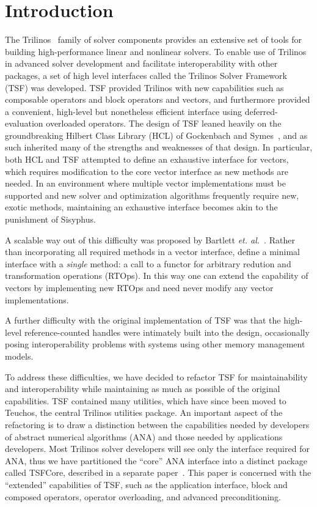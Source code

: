 \section{Introduction}

The Trilinos~\cite{ref:trilinos} 
family of solver components provides an extensive set of
tools for building high-performance linear and nonlinear solvers. To 
enable use of Trilinos in advanced solver development
and facilitate interoperability
with other packages, a set of high level interfaces called the Trilinos
Solver Framework~\cite{ref:TSF} (TSF) was developed. 
TSF provided
Trilinos with 
new capabilities such as composable operators and block operators and vectors, 
and furthermore provided a convenient, high-level but nonetheless efficient
interface using deferred-evaluation overloaded operators.  The design of 
TSF leaned heavily on the groundbreaking
Hilbert Class Library (HCL) of Gockenbach and Symes~\cite{ref:hcl}, and as 
such inherited many of the strengths and weaknesses of that design. 
In particular, both HCL and TSF attempted to define an exhaustive interface
for vectors, which requires modification to the core vector interface
as new methods are needed. In an environment where multiple 
vector implementations must be supported and new solver and
optimization algorithms frequently require new, exotic methods,
maintaining an exhaustive
interface becomes akin to the punishment of Sisyphus.

A scalable way out of this difficulty was 
proposed by Bartlett {\it et. al.}~\cite{ref:rtop_toms}.
Rather than incorporating all
required methods in a vector interface, define a minimal interface
with a {\it single} method: a call to a functor for arbitrary redution
and transformation operations (RTOps). In this way one can
extend the capability of vectors by implementing new RTOps and need never
modify any vector implementations.  

A further difficulty with the original implementation of TSF was that the
high-level reference-counted 
handles were intimately built into the design, occasionally
posing interoperability problems with systems using other memory management
models. 

To address these difficulties, we have decided to refactor TSF for 
maintainability and interoperability while maintaining as much as possible
of the original capabilities. TSF contained many utilities, which
have since been moved to Teuchos, the central Trilinos utilities
package. An important aspect of the refactoring is to draw
a distinction between the capabilities needed by developers of abstract
numerical algorithms (ANA) and those needed by applications developers.
Most Trilinos solver 
developers will see only the interface required for ANA, thus
we have partitioned the ``core'' ANA interface into a distinct package
called TSFCore, described in a separate paper~\cite{ref:TSFCore}.
This paper is concerned with the ``extended'' capabilities of TSF, such
as the application interface, block and composed operators, operator
overloading, and advanced preconditioning.





